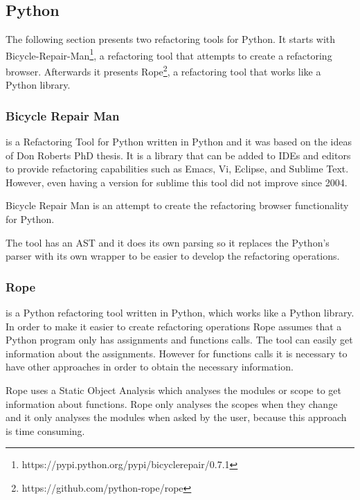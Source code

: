 \subsection{Python}

The following section presents two refactoring tools for Python. 
It starts with Bicycle-Repair-Man\footnote{https://pypi.python.org/pypi/bicyclerepair/0.7.1}, a refactoring tool that attempts to create a refactoring browser. 
Afterwards it presents Rope\footnote{https://github.com/python-rope/rope}, a refactoring tool that works like a Python library.

\subsubsection{Bicycle Repair Man}

 is a Refactoring Tool for Python written in Python and it was based on the ideas of Don Roberts PhD thesis. 
 It is a library that can be added to IDEs and editors to provide refactoring capabilities such as Emacs, Vi, Eclipse, and Sublime Text. 
 However, even having a version for sublime this tool did not improve since 2004.

Bicycle Repair Man is an attempt to create the refactoring browser functionality for Python. 

The tool has an AST and it does its own parsing so it replaces the Python's parser with its own wrapper to be easier to develop the refactoring operations.


\subsubsection{Rope }

 is a Python refactoring tool written in Python, which works like a Python library.
In order to make it easier to create refactoring operations Rope assumes that a Python program only has assignments and functions calls. %
The tool can easily get information about the assignments. 
However for functions calls it is necessary to have other approaches in order to obtain the necessary information. 

Rope uses a Static Object Analysis which analyses the modules or scope to get information about functions. 
Rope only analyses the scopes when they change and it only analyses the modules when asked by the user, because this approach is time consuming. 

